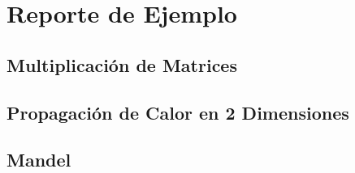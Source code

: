\documentclass[a4paper]{report}
\begin{document}



\appendix

\chapter{Reporte de Ejemplo} \label{examples}

\section{Multiplicación de Matrices}  \label{example-matrix}


\section{Propagación de Calor en 2 Dimensiones} \label{example-heat2d}


\section{Mandel} \label{example-mandel}

\end{document}
